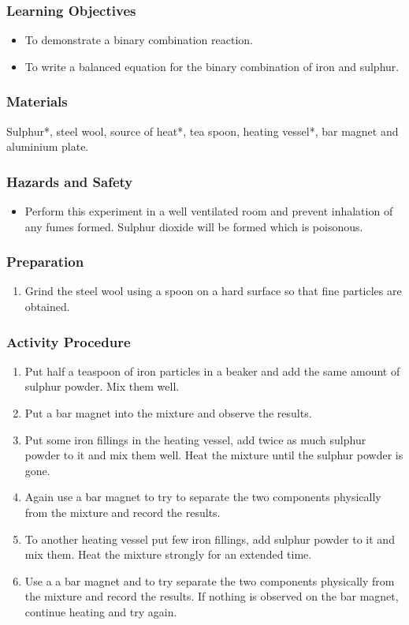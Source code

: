 \subsubsection*{Learning Objectives}
\begin{itemize}
\item{To demonstrate a binary combination reaction.}
\item{To write a balanced equation for the binary combination of iron and sulphur.}
\end{itemize}

\subsubsection*{Materials}
Sulphur*, steel wool, source of heat*, tea spoon, heating vessel*, bar magnet and aluminium plate.

\subsubsection*{Hazards and Safety}
\begin{itemize}
\item{Perform this experiment in a well ventilated room and prevent inhalation of any fumes formed. Sulphur dioxide will be formed which is poisonous.}
\end{itemize}

\subsubsection*{Preparation}
\begin{enumerate}
\item{Grind the steel wool using a spoon on a hard surface so that fine particles are obtained.}
\end{enumerate}

\subsubsection*{Activity Procedure}
\begin{enumerate}
\item{Put half a teaspoon of iron particles in a beaker and add the same amount of sulphur powder. Mix them well.}
\item{Put a bar magnet into the mixture and observe the results.}
\item{Put some iron fillings in the heating vessel, add twice as much sulphur powder to it and mix them well. Heat the mixture until the sulphur powder is gone.}
\item{Again use a bar magnet to try to separate the two components physically from the mixture and record the results.}
\item{To another heating vessel put few iron fillings, add sulphur powder to it and mix them. Heat the mixture strongly for an extended time.}
\item{Use a a bar magnet and to try separate the two components physically from the mixture and record the results. If nothing is observed on the bar magnet, continue heating and try again.}
\end{enumerate}

